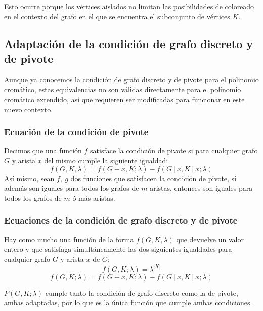 \documentclass{article}
\numberwithin{figure}{section}
\begin{document}
    Esto ocurre porque los vértices aislados no limitan las posibilidades de coloreado en el contexto del grafo en el que se encuentra el subconjunto de vértices $K$.

\subsection{Adaptación de la condición de grafo discreto y de pivote}

Aunque ya conocemos la condición de grafo discreto y de pivote para el polinomio cromático, estas equivalencias no son válidas directamente para el polinomio cromático extendido, así que requieren ser modificadas para funcionar en este nuevo contexto.

\subsubsection{Ecuación de la condición de pivote}
    Decimos que una función $f$ satisface la condición de pivote si para cualquier grafo $G$ y arista $x$ del mismo cumple la siguiente igualdad:
    \begin{equation*}
        f(G, K, \lambda) = f(G - x, K; \lambda) - f(G\ |\ x, K\ |\ x; \lambda)
    \end{equation*}
    Así mismo, sean $f,\ g$ dos funciones que satisfacen la condición de pivote, si además son iguales para todos los grafos de $m$ aristas, entonces son iguales para todos los grafos de $m$ ó más aristas.

\subsubsection{Ecuaciones de la condición de grafo discreto y de pivote}
    Hay como mucho una función de la forma $f(G, K, \lambda)$ que devuelve un valor entero y que satisfaga simultáneamente las dos siguientes igualdades para cualquier grafo $G$ y arista $x$ de $G$:
    \begin{equation*}
        f(G, K; \lambda) = \lambda^{|K|}
    \end{equation*}
    \begin{equation*}
        f(G, K; \lambda) = f(G - x, K; \lambda) - f(G\ |\ x, K\ |\ x; \lambda)
    \end{equation*}

    $P(G, K; \lambda)$ cumple tanto la condición de grafo discreto como la de pivote, ambas adaptadas, por lo que es la única función que cumple ambas condiciones.
\end{document}

